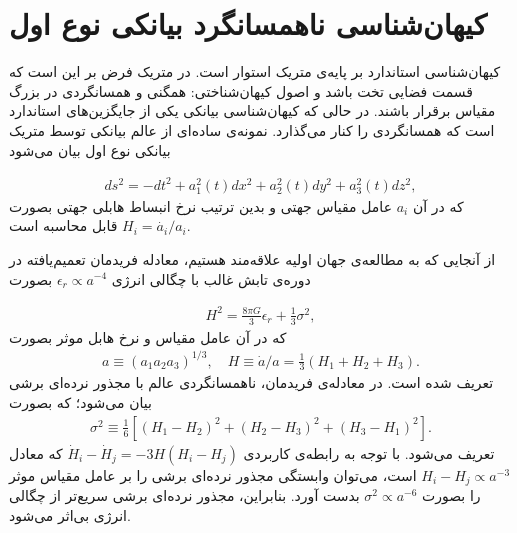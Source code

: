 \documentclass[a4paper]{book}
\begin{document}
\section{کیهان‌شناسی ناهمسانگرد بیانکی نوع اول}
\label{sec:anisotropic}
‌کیهان‌شناسی استاندارد بر پایه‌ی متریک  استوار است. در متریک  فرض بر این است که قسمت فضایی تخت باشد و اصول کیهان‌شناختی: همگنی و همسانگردی در بزرگ مقیاس برقرار باشند. در حالی که کیهان‌شناسی بیانکی یکی از جایگزین‌های استاندارد است که همسانگردی را کنار می‌گذارد. نمونه‌ی ساده‌ای از عالم بیانکی توسط متریک بیانکی نوع اول بیان می‌شود \cite{Ellis:1968vb,delliou_anisotropic_2020,Russell:2013oda,jacobs1969bianchi}
\par
\vspace{-0.5cm}
{\footnotesize\begin{align}
	ds^2 = -dt^2 + a_1^2(t) dx^2 + a_2^2(t) dy^2 + a_3^2(t) dz^2,
	\label{eq:BI-metric-anisotropic}
\end{align}}
که در آن {\footnotesize$a_i$} عامل مقیاس جهتی و بدین ترتیب نرخ انبساط هابلی جهتی بصورت {\footnotesize$H_i=\dot{a_i}/a_i$} قابل محاسبه است.

از آنجایی که به مطالعه‌ی جهان اولیه علاقه‌مند هستیم، معادله فریدمان تعمیم‌یافته در دوره‌ی تابش غالب با چگالی انرژی {\footnotesize$\epsilon_r \propto a^{-4}$} بصورت
\par
\vspace{-0.5cm}
{\footnotesize\begin{align}
	H^2 = \frac{8 \pi G}{3} \epsilon_r + \frac{1}{3} \sigma^2,
	\label{eq:Friedmann-Eq.-anisotropic}
\end{align}}
که در آن عامل مقیاس و نرخ هابل موثر بصورت
{\footnotesize\begin{align}
	a \equiv \left(a_1 a_2 a_3\right)^{1/3}, \quad H \equiv\dot{a}/a = \frac{1}{3} \left(H_1+H_2+H_3\right).
	\label{eq:Hubble-definition-anisotropic}
\end{align}}
تعریف شده است. در معادله‌ی فریدمان، ناهمسانگردی عالم با مجذور نرده‌ای برشی  بیان می‌شود؛ که بصورت
{\footnotesize\begin{align}
	\sigma^2 \equiv \frac{1}{6} \left[\left(H_1-H_2\right)^2+\left(H_2-H_3\right)^2+\left(H_3-H_1\right)^2\right].
\end{align}}
تعریف می‌شود. با توجه به رابطه‌ی کاربردی {\footnotesize$\dot{H}_i - \dot{H}_j = -3 H \left(H_i - H_j\right)$} که معادل {\footnotesize$H_i - H_j \propto a^{-3}$} است، می‌توان وابستگی مجذور نرده‌ای برشی را بر عامل مقیاس موثر را بصورت {\footnotesize$\sigma^2 \propto a^{-6}$} بدست آورد. بنابراین، مجذور نرده‌ای برشی سریع‌تر از چگالی انرژی بی‌اثر می‌شود.
									
\end{document}
